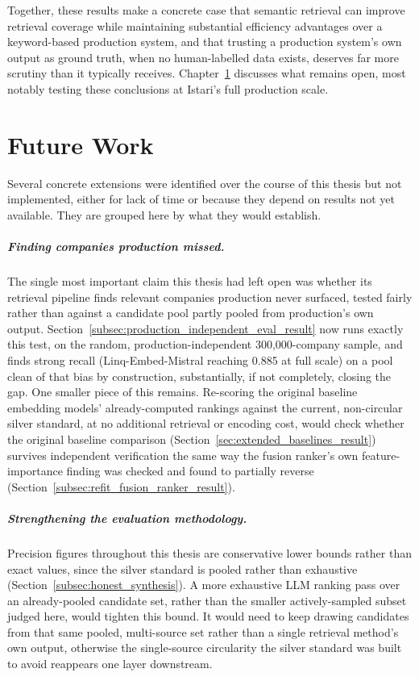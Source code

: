 \documentclass[a4paper,oneside,bibliography=totoc]{scrbook}
\begin{document}
Together, these results make a concrete case that semantic retrieval can improve retrieval coverage while maintaining substantial efficiency advantages over a keyword-based production system, and that trusting a production system's own output as ground truth, when no human-labelled data exists, deserves far more scrutiny than it typically receives. Chapter~\ref{ch:future_work} discusses what remains open, most notably testing these conclusions at Istari's full production scale.

\chapter{Future Work}
\label{ch:future_work}

Several concrete extensions were identified over the course of this thesis but not implemented, either for lack of time or because they depend on results not yet available. They are grouped here by what they would establish.

\paragraph{Finding companies production missed.} The single most important claim this thesis had left open was whether its retrieval pipeline finds relevant companies production never surfaced, tested fairly rather than against a candidate pool partly pooled from production's own output. Section~\ref{subsec:production_independent_eval_result} now runs exactly this test, on the random, production-independent 300,000-company sample, and finds strong recall (Linq-Embed-Mistral reaching 0.885 at full scale) on a pool clean of that bias by construction, substantially, if not completely, closing the gap. One smaller piece of this remains. Re-scoring the original baseline embedding models' already-computed rankings against the current, non-circular silver standard, at no additional retrieval or encoding cost, would check whether the original baseline comparison (Section~\ref{sec:extended_baselines_result}) survives independent verification the same way the fusion ranker's own feature-importance finding was checked and found to partially reverse (Section~\ref{subsec:refit_fusion_ranker_result}).

\paragraph{Strengthening the evaluation methodology.} Precision figures throughout this thesis are conservative lower bounds rather than exact values, since the silver standard is pooled rather than exhaustive (Section~\ref{subsec:honest_synthesis}). A more exhaustive LLM ranking pass over an already-pooled candidate set, rather than the smaller actively-sampled subset judged here, would tighten this bound. It would need to keep drawing candidates from that same pooled, multi-source set rather than a single retrieval method's own output, otherwise the single-source circularity the silver standard was built to avoid reappears one layer downstream.
\end{document}

